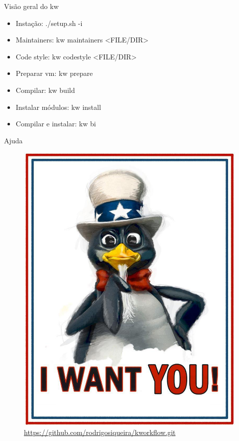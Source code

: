 \documentclass[10pt, compress, aspectratio=169]{beamer}
\begin{document}
\begin{frame}{Visão geral do kw}
  \begin{itemize}
    \item Instação: ./setup.sh -i \pause
    \item Maintainers: kw maintainers <FILE/DIR> \pause
    \item Code style: kw codestyle <FILE/DIR> \pause
    \item Preparar vm: kw prepare \pause
    \item Compilar: kw build \pause
    \item Instalar módulos: kw install \pause
    \item Compilar e instalar: kw bi
  \end{itemize}
\end{frame}

\begin{frame}{Ajuda}
  \begin{figure}
    \centering
    \includegraphics[width=\linewidth,
                     height=0.8\textheight,
                     keepaspectratio]{want_you}
    \caption{\url{https://github.com/rodrigosiqueira/kworkflow.git}}
  \end{figure}
\end{frame}
\end{document}
